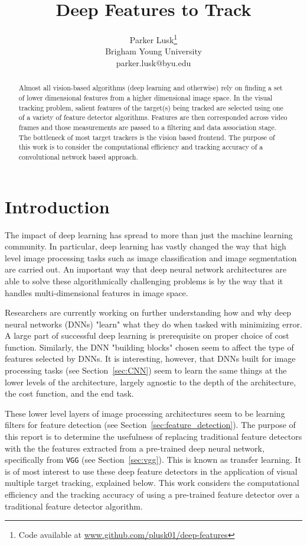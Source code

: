 \documentclass[hidelinks]{article}
\title{Deep Features to Track}
\author{
  Parker Lusk\thanks{Code available at \url{www.github.com/plusk01/deep-features}} \\
  Brigham Young University \\
  parker.lusk@byu.edu
  }
\begin{document}
\maketitle


\begin{abstract}
Almost all vision-based algorithms (deep learning and otherwise) rely on finding a set of lower dimensional features from a higher dimensional image space. In the visual tracking problem, salient features of the target(s) being tracked are selected using one of a variety of feature detector algorithms. Features are then corresponded across video frames and those measurements are passed to a filtering and data association stage. The bottleneck of most target trackers is the vision based frontend. The purpose of this work is to consider the computational efficiency and tracking accuracy of a convolutional network based approach.
\end{abstract}

\section{Introduction}

The impact of deep learning has spread to more than just the machine learning community. In particular, deep learning has vastly changed the way that high level image processing tasks such as image classification and image segmentation are carried out. An important way that deep neural network architectures are able to solve these algorithmically challenging problems is by the way that it handles multi-dimensional features in image space.

Researchers are currently working on further understanding how and why deep neural networks (DNNs) "learn" what they do when tasked with minimizing error. A large part of successful deep learning is prerequisite on proper choice of cost function. Similarly, the DNN "building blocks" chosen seem to affect the type of features selected by DNNs. It is interesting, however, that DNNs built for image processing tasks (see Section~\ref{sec:CNN}) seem to learn the same things at the lower levels of the architecture, largely agnostic to the depth of the architecture, the cost function, and the end task.

These lower level layers of image processing architectures seem to be learning filters for feature detection (see Section~\ref{sec:feature_detection}). The purpose of this report is to determine the usefulness of replacing traditional feature detectors with the the features extracted from a pre-trained deep neural network, specifically from \texttt{VGG} (see Section~\ref{sec:vgg}). This is known as transfer learning. It is of most interest to use these deep feature detectors in the application of visual multiple target tracking, explained below. This work considers the computational efficiency and the tracking accuracy of using a pre-trained feature detector over a traditional feature detector algorithm.
\end{document}
